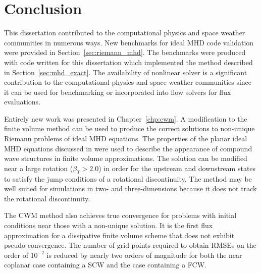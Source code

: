 %
%


\chapter[Conclusion]{Conclusion}
\label{chp:conclusion}

This dissertation contributed to the computational physics and space weather communities in numerous ways.  New benchmarks for ideal MHD code validation were provided in Section~\ref{sec:riemann_mhd}.  The benchmarks were produced with code written for this dissertation which implemented the method described in Section~\ref{sec:mhd_exact}.  The availability of nonlinear solver is a significant contribution to the computational physics and space weather communities since it can be used for benchmarking or incorporated into flow solvers for flux evaluations.  

Entirely new work was presented in Chapter~\ref{chp:cwm}.  A modification to the finite volume method can be used to produce the correct solutions to non-unique Riemann problems of ideal MHD equations.  The properties of the planar ideal MHD equations discussed in \citep{Falle:2001} were used to describe the appearance of compound wave structures in finite volume approximations.  The solution can be modified near a large rotation ($\beta_T > 2.0$) in order for the upstream and downstream states to satisfy the jump conditions of a rotational discontinuity.  The method may be well suited for simulations in two- and three-dimensions because it does not track the rotational discontinuity.

The CWM method also achieves true convergence for problems with initial conditions near those with a non-unique solution.  It is the first flux approximation for a dissipative finite volume scheme that does not exhibit pseudo-convergence.  The number of grid points required to obtain RMSEs on the order of $10^{-2}$ is reduced by nearly two orders of magnitude for both the near coplanar case containing a SCW and the case containing a FCW.  

